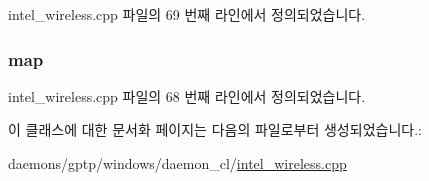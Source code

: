 intel\+\_\+wireless.\+cpp 파일의 69 번째 라인에서 정의되었습니다.

\subsubsection[{\texorpdfstring{map}{map}}]{ map}\hypertarget{class_locked_timestamper_context_map_a8880e18111e491249278c4cebf453b97}{}\label{class_locked_timestamper_context_map_a8880e18111e491249278c4cebf453b97}


intel\+\_\+wireless.\+cpp 파일의 68 번째 라인에서 정의되었습니다.



이 클래스에 대한 문서화 페이지는 다음의 파일로부터 생성되었습니다.\+:\begin{DoxyCompactItemize}
\item 
daemons/gptp/windows/daemon\+\_\+cl/\hyperlink{intel__wireless_8cpp}{intel\+\_\+wireless.\+cpp}\end{DoxyCompactItemize}
